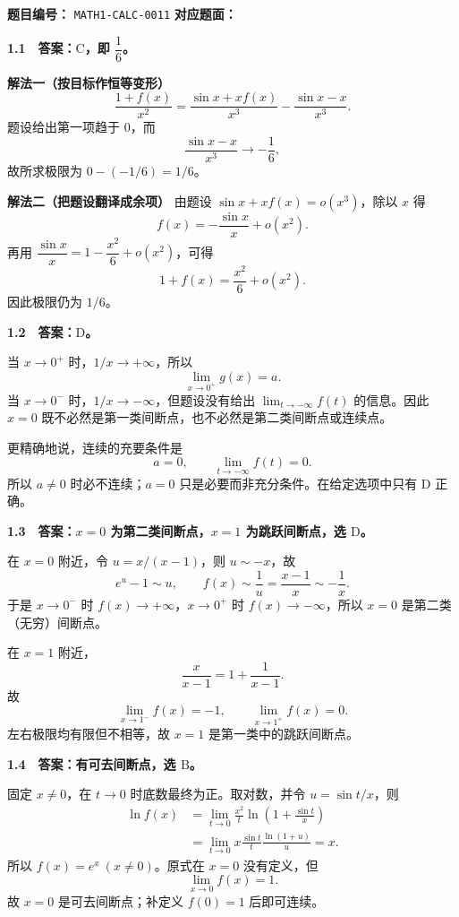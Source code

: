 \begin{problemMeta}
\textbf{题目编号：} \texttt{MATH1-CALC-0011}\quad
\textbf{对应题面：} 
\end{problemMeta}

\begin{solutionBox}
\textbf{1.1　答案：\(\mathrm{C}\)，即 \(\dfrac16\)。}

\textbf{解法一（按目标作恒等变形）}
\[
\frac{1+f(x)}{x^2}
=\frac{\sin x+xf(x)}{x^3}-\frac{\sin x-x}{x^3}.
\]
题设给出第一项趋于 \(0\)，而
\[
\frac{\sin x-x}{x^3}\to-\frac16,
\]
故所求极限为 \(0-(-1/6)=1/6\)。

\textbf{解法二（把题设翻译成余项）}
由题设 \(\sin x+xf(x)=o(x^3)\)，除以 \(x\) 得
\[
f(x)=-\frac{\sin x}{x}+o(x^2).
\]
再用 \(\dfrac{\sin x}{x}=1-\dfrac{x^2}{6}+o(x^2)\)，可得
\[
1+f(x)=\frac{x^2}{6}+o(x^2).
\]
因此极限仍为 \(1/6\)。
\end{solutionBox}

\begin{solutionBox}
\textbf{1.2　答案：\(\mathrm{D}\)。}

当 \(x\to0^+\) 时，\(1/x\to+\infty\)，所以
\[
\lim_{x\to0^+}g(x)=a.
\]
当 \(x\to0^-\) 时，\(1/x\to-\infty\)，但题设没有给出
\(\lim_{t\to-\infty}f(t)\) 的信息。因此 \(x=0\) 既不必然是第一类间断点，也不必然是第二类间断点或连续点。

更精确地说，连续的充要条件是
\[
a=0,\qquad \lim_{t\to-\infty}f(t)=0.
\]
所以 \(a\ne0\) 时必不连续；\(a=0\) 只是必要而非充分条件。在给定选项中只有 \(\mathrm D\) 正确。
\end{solutionBox}

\begin{solutionBox}
\textbf{1.3　答案：\(x=0\) 为第二类间断点，\(x=1\) 为跳跃间断点，选 \(\mathrm D\)。}

在 \(x=0\) 附近，令 \(u=x/(x-1)\)，则 \(u\sim-x\)，故
\[
e^u-1\sim u,\qquad
f(x)\sim\frac1u=\frac{x-1}{x}\sim-\frac1x.
\]
于是 \(x\to0^-\) 时 \(f(x)\to+\infty\)，\(x\to0^+\) 时
\(f(x)\to-\infty\)，所以 \(x=0\) 是第二类（无穷）间断点。

在 \(x=1\) 附近，
\[
\frac{x}{x-1}=1+\frac1{x-1}.
\]
故
\[
\lim_{x\to1^-}f(x)=-1,
\qquad
\lim_{x\to1^+}f(x)=0.
\]
左右极限均有限但不相等，故 \(x=1\) 是第一类中的跳跃间断点。
\end{solutionBox}

\begin{solutionBox}
\textbf{1.4　答案：有可去间断点，选 \(\mathrm B\)。}

固定 \(x\ne0\)，在 \(t\to0\) 时底数最终为正。取对数，并令
\(u=\sin t/x\)，则
\[
\begin{aligned}
\ln f(x)
&=\lim_{t\to0}\frac{x^2}{t}\ln\left(1+\frac{\sin t}{x}\right)\\
&=\lim_{t\to0}
x\frac{\sin t}{t}\frac{\ln(1+u)}{u}
=x.
\end{aligned}
\]
所以 \(f(x)=e^x\ (x\ne0)\)。原式在 \(x=0\) 没有定义，但
\[
\lim_{x\to0}f(x)=1.
\]
故 \(x=0\) 是可去间断点；补定义 \(f(0)=1\) 后即可连续。
\end{solutionBox}

